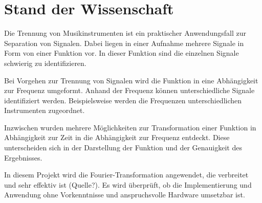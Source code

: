 \chapter{Stand der Wissenschaft}
\label{stand_der_wissenschaft}

Die Trennung von Musikinstrumenten ist ein praktischer Anwendungsfall zur Separation von Signalen. Dabei liegen in einer Aufnahme mehrere Signale in Form von einer Funktion vor. In dieser Funktion sind die einzelnen Signale schwierig zu identifizieren.

\par

Bei Vorgehen zur Trennung von Signalen wird die Funktion in eine Abhängigkeit zur Frequenz umgeformt. Anhand der Frequenz können unterschiedliche Signale identifiziert werden. Beispielsweise werden die Frequenzen unterschiedlichen Instrumenten zugeordnet.

\par

Inzwischen wurden mehrere Möglichkeiten zur Transformation einer Funktion in Abhängigkeit zur Zeit in die Abhängigkeit zur Frequenz entdeckt. Diese unterscheiden sich in der Darstellung der Funktion und der Genauigkeit des Ergebnisses.

\par

In diesem Projekt wird die Fourier-Transformation angewendet, die verbreitet und sehr effektiv ist (Quelle?). Es wird überprüft, ob die Implementierung und Anwendung ohne Vorkenntnisse und anspruchsvolle Hardware umsetzbar ist.



